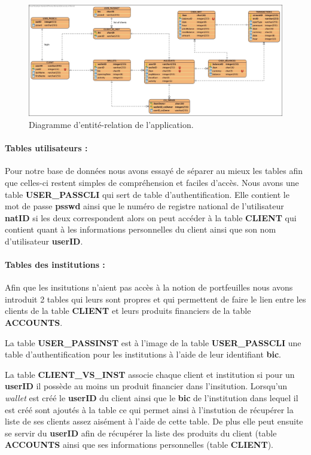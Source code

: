 \documentclass[../rapport.tex]{subfiles}
\begin{document}
	
	\begin{figure}[h]
		\centering \includegraphics[scale=0.3]{ressources/photos_diagrammes/erd.jpg}
		\caption{Diagramme d'entité-relation de l'application.}
	\end{figure}
	
	\paragraph{Tables utilisateurs :}
	Pour notre base de données nous avons essayé de séparer au mieux les tables afin que celles-ci restent simples de compréhension et faciles d'accès. Nous avons une table \textbf{USER\_PASSCLI} qui sert de table d'authentification. Elle contient le mot de passe \textbf{psswd} ainsi que le numéro de registre national de l'utilisateur \textbf{natID} si les deux correspondent alors on peut accéder à la table \textbf{CLIENT} qui contient quant à les informations personnelles du client ainsi que son nom d'utilisateur \textbf{userID}.
	
	\paragraph{Tables des institutions :} Afin que les insitutions n'aient pas accès à la notion de portfeuilles nous avons introduit 2 tables qui leurs sont propres et qui permettent de faire le lien entre les clients de la table \textbf{CLIENT} et leurs produits financiers de la table \textbf{ACCOUNTS}.
	
	\medskip
	
	La table \textbf{USER\_PASSINST} est à l'image de la table 
	\textbf{USER\_PASSCLI} une table d'authentification pour les institutions à l'aide de leur identifiant \textbf{bic}. 
	
	\medskip
	
	La table \textbf{CLIENT\_VS\_INST} associe chaque client et institution si pour un \textbf{userID} il possède au moins un produit financier dans l'insitution. Lorsqu'un \textit{wallet} est créé le \textbf{userID} du client ainsi que le \textbf{bic} de l'institution dans lequel il est créé sont ajoutés à la table ce qui permet ainsi à l'instution de récupérer la liste de ses clients assez aisément à l'aide de cette table. De plus elle peut ensuite se servir du \textbf{userID} afin de récupérer la liste des produits du client (table \textbf{ACCOUNTS} ainsi que ses informations personnelles (table \textbf{CLIENT}).
	
\end{document}

